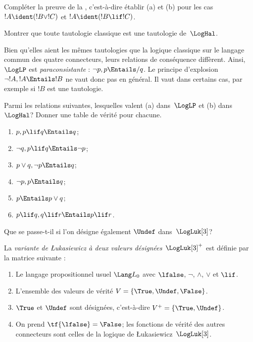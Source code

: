 \documentclass[../../../include/open-logic-section]{subfiles}
\begin{document}
\begin{prob}
  Compléter la preuve de la
  ,
  c'est-à-dire établir (a) et (b)
  pour les cas
  $!A\ident(!B\lor !C)$ et
  $!A\ident(!B\lif !C)$.
\end{prob}

\begin{prob}
Montrer que toute tautologie classique
est une tautologie de~$\LogHal$.
\end{prob}

Bien qu'elles aient les mêmes
tautologies que la logique classique
sur le langage commun des quatre
connecteurs, leurs relations de
conséquence diffèrent. Ainsi,
$\LogLP$ est \emph{paraconsistante} :
$\lnot p,p\Entails/ q$. Le principe
d'explosion
$\lnot !A,!A\Entails !B$
ne vaut donc pas en général. Il vaut
dans certains cas, par exemple si
$!B$ est une tautologie.

\begin{prob}
  Parmi les relations suivantes,
  lesquelles valent (a) dans~$\LogLP$
  et (b) dans~$\LogHal$? Donner une
  table de vérité pour chacune.
  \begin{enumerate}
    \item $p,p\lif q\Entails q$;
    \item $\lnot q,p\lif q\Entails\lnot p$;
    \item $p\lor q,\lnot p\Entails q$;
    \item $\lnot p,p\Entails q$;
    \item $p\Entails p\lor q$;
    \item $p\lif q,q\lif r\Entails p\lif r$.
  \end{enumerate}
\end{prob}

Que se passe-t-il si l'on désigne
également $\Undef$ dans~$\LogLuk[3]$?

\begin{defn}
  La \emph{variante de \L ukasiewicz à deux valeurs
  désignées}~$\LogLuk[3]^{+}$ est définie
  par la matrice suivante :
  \begin{enumerate}
    \item Le langage propositionnel usuel
    $\Lang L_0$ avec $\lfalse$,
    $\lnot$, $\land$, $\lor$ et $\lif$.
    \item L'ensemble des valeurs de vérité
    $V=\{\True,\Undef,\False\}$.
    \item $\True$ et $\Undef$ sont
    désignées, c'est-à-dire
    $V^+=\{\True,\Undef\}$.
    \item On prend
    $\tf{\lfalse}=\False$; les
    fonctions de vérité des autres
    connecteurs sont celles de la
    logique de \L ukasiewicz~$\LogLuk[3]$.
  \end{enumerate}
\end{defn}
\end{document}

